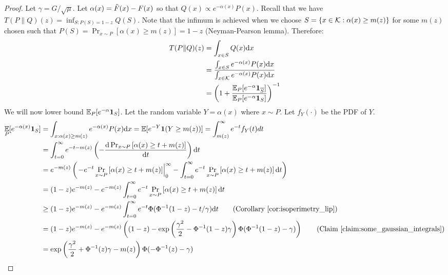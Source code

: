 \begin{proof}
Let $\gamma=G/\sqrt{\mu}.$
Let $\alpha(x)=\Tilde{F}(x)-F(x)$ so that $Q(x)\propto e^{-\alpha(x)} P(x)$. Recall that we have $T(P\|Q)(z)=\inf_{S:P(S)=1-z} Q(S)$. Note that the infimum is achieved when we choose 
$S=\left\{ x\in\mathcal K: \alpha(x) \ge m(z)\right\}$ for some $m(z)$ chosen such that 
$P(S)=\Pr_{x\sim P}[\alpha(x)\ge m(z)]=1-z$ (Neyman-Pearson lemma). Therefore:
\begin{align*}
T(P\|Q)(z)&= \int_{x\in S} Q(x) \mathrm{d} x\\
&= \frac{\int_{x\in S} e^{-\alpha(x)} P(x) \mathrm{d} x}{\int_{x\in\mathcal K} e^{-\alpha(x)} P(x) \mathrm{d} x}\\
&= \left( 1+\frac{\operatorname*{\mathbb{E}}_P[e^{-\alpha}\mathbf{1}_{\overline{S}}]}{\operatorname*{\mathbb{E}}_P[e^{-\alpha}\mathbf{1}_S]}\right)^{-1}
\end{align*}
We will now lower bound $\operatorname*{\mathbb{E}}_P[e^{-\alpha}\mathbf{1}_S]$. Let the random variable $Y=\alpha(x)$ where $x\sim P.$ Let $f_Y(\cdot)$ be the PDF of $Y$.
\begin{align*}
\E_P[e^{-\alpha(x)}\Ind_S]&=\int_{x: \alpha(x)\ge m(z)}e^{-\alpha(x)}P(x) \d x=\E[e^{-Y}\Ind(Y\ge m(z))]=\int_{m(z)}^\infty e^{-t} f_Y(t) dt\\
&= \int_{t=0}^\infty e^{-t-m(z)} \lp -\frac{\d\Pr_{x\sim P}\lb\alpha(x)\ge t+m(z)\rb}{\d t}\rp \d t\\
&=  e^{-m(z)}\lp \left.-e^{-t}\Pr_{x\sim P}\lb\alpha(x)\ge t+m(z)\rb\right\vert_{0}^\infty - \int_{t=0}^\infty e^{-t} \Pr_{x\sim P}\lb\alpha(x)\ge t+m(z)\rb \d t\rp\\
&=  (1-z)e^{-m(z)} - e^{-m(z)}\int_{t=0}^\infty e^{-t} \Pr_{x\sim P}\lb\alpha(x)\ge t+m(z)\rb \d t\\
&\ge (1-z)e^{-m(z)} - e^{-m(z)}\int_{t=0}^\infty e^{-t} \Phi(\Phi^{-1}(1-z)-t/\gamma) \d t \tag{Corollary~\ref{cor:isoperimetry_lip}}\\
&= (1-z)e^{-m(z)} - e^{-m(z)}\lp (1-z) - \exp\lp\frac{\gamma^2}{2}-\Phi^{-1}(1-z)\gamma\rp \Phi(\Phi^{-1}(1-z)-\gamma) \rp \tag{Claim \ref{claim:some_gaussian_integrals}}\\
&= \exp\lp\frac{\gamma^2}{2}+\Phi^{-1}(z)\gamma-m(z)\rp \Phi(-\Phi^{-1}(z)-\gamma)
\end{align*}



\end{proof}
